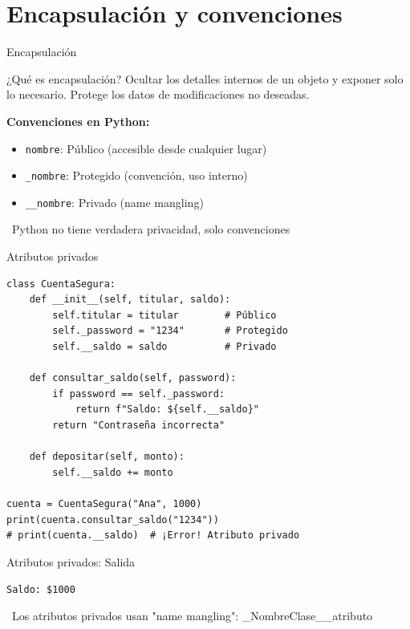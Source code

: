 \documentclass{beamer}
\begin{document}
\section{Encapsulación y convenciones}

\begin{frame}[fragile]{Encapsulación \faLock}
\begin{conceptbox}{¿Qué es encapsulación?}
Ocultar los detalles internos de un objeto y exponer solo lo necesario. Protege los datos de modificaciones no deseadas.
\end{conceptbox}

\textbf{Convenciones en Python:}
\small
\begin{itemize}
    \item[\faUnlock] \texttt{nombre}: Público (accesible desde cualquier lugar)
    \item[\faKey] \texttt{\_nombre}: Protegido (convención, uso interno)
    \item[\faLock] \texttt{\_\_nombre}: Privado (name mangling)
\end{itemize}

\vspace{0.2cm}
\begin{notebox}
\small\faInfoCircle\ Python no tiene verdadera privacidad, solo convenciones
\end{notebox}
\end{frame}

\begin{frame}[fragile]{Atributos privados \faUserSecret}
\begin{lstlisting}
class CuentaSegura:
    def __init__(self, titular, saldo):
        self.titular = titular        # Público
        self._password = "1234"       # Protegido
        self.__saldo = saldo          # Privado
    
    def consultar_saldo(self, password):
        if password == self._password:
            return f"Saldo: ${self.__saldo}"
        return "Contraseña incorrecta"
    
    def depositar(self, monto):
        self.__saldo += monto

cuenta = CuentaSegura("Ana", 1000)
print(cuenta.consultar_saldo("1234"))
# print(cuenta.__saldo)  # ¡Error! Atributo privado
\end{lstlisting}
\end{frame}

\begin{frame}[fragile]{Atributos privados: Salida \faArrowCircleRight}
\begin{tcolorbox}[colback=green!10,colframe=green,title={\small\faArrowCircleRight \ Salida},coltitle=fg0,left=3pt,right=3pt,top=3pt,bottom=3pt,boxsep=2pt]
\small\texttt{Saldo: \$1000}
\end{tcolorbox}

\vspace{0.3cm}
\begin{notebox}
\small\faExclamationTriangle\ Los atributos privados usan "name mangling": \_NombreClase\_\_atributo
\end{notebox}
\end{frame}
\end{document}
